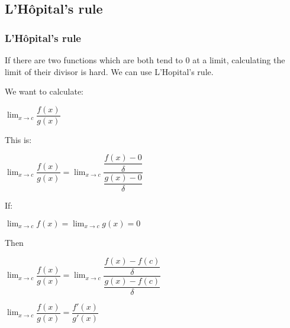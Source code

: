 
\subsection{L'Hôpital's rule}

\subsubsection{L'Hôpital's rule}

If there are two functions which are both tend to \(0\) at a limit, calculating the limit of their divisor is hard. We can use L'Hopital's rule.

We want to calculate:

\(\lim_{x\rightarrow c}\dfrac{f(x)}{g(x)}\)

This is:

\(\lim_{x\rightarrow c}\dfrac{f(x)}{g(x)}=\lim_{x\rightarrow c}\dfrac{\dfrac{f(x)-0}{\delta}}{\dfrac{g(x)-0}{\delta}}\)

If:

\(\lim_{x\rightarrow c}f(x)=\lim_{x\rightarrow c}g(x)=0\)

Then

\(\lim_{x\rightarrow c}\dfrac{f(x)}{g(x)}=\lim_{x\rightarrow c}\dfrac{\dfrac{f(x)-f(c)}{\delta}}{\dfrac{g(x)-f(c)}{\delta}}\)

\(\lim_{x\rightarrow c}\dfrac{f(x)}{g(x)}=\dfrac{f'(x)}{g'(x)}\)

